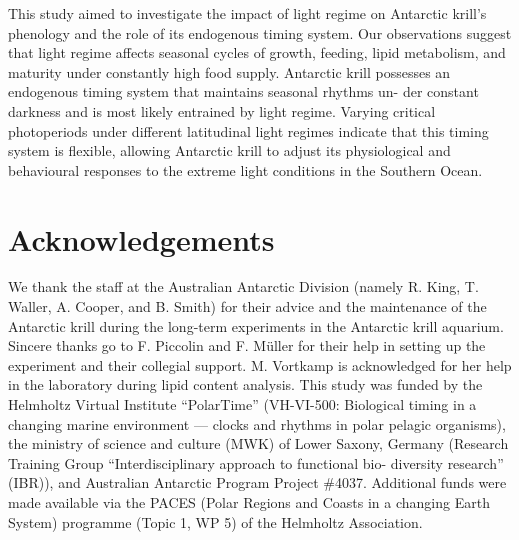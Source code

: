 This study aimed to investigate the impact of light regime on Antarctic krill’s
phenology and the role of its endogenous timing system. Our observations
suggest that light regime affects seasonal cycles of growth, feeding, lipid
metabolism, and maturity under constantly high food supply. Antarctic krill
possesses an endogenous timing system that maintains seasonal rhythms un- der
constant darkness and is most likely entrained by light regime. Varying
critical photoperiods under different latitudinal light regimes indicate that
this timing system is flexible, allowing Antarctic krill to adjust its
physiological and behavioural responses to the extreme light conditions in the
Southern Ocean. 

\section{Acknowledgements}

We thank the staff at the Australian Antarctic Division (namely R. King, T.
Waller, A. Cooper, and B. Smith) for their advice and the maintenance of the
Antarctic krill during the long-term experiments in the Antarctic krill
aquarium. Sincere thanks go to F. Piccolin and F. Müller for their help in
setting up the experiment and their collegial support. M. Vortkamp is
acknowledged for her help in the laboratory during lipid content analysis. This
study was funded by the Helmholtz Virtual Institute “PolarTime” (VH-VI-500:
Biological timing in a changing marine environment — clocks and rhythms in
polar pelagic organisms), the ministry of science and culture (MWK) of Lower
Saxony, Germany (Research Training Group “Interdisciplinary approach to
functional bio- diversity research” (IBR)), and Australian Antarctic Program
Project \#4037. Additional funds were made available via the PACES (Polar
Regions and Coasts in a changing Earth System) programme (Topic 1, WP 5) of the
Helmholtz Association. 

\printbibliography[heading=subbibliography]
